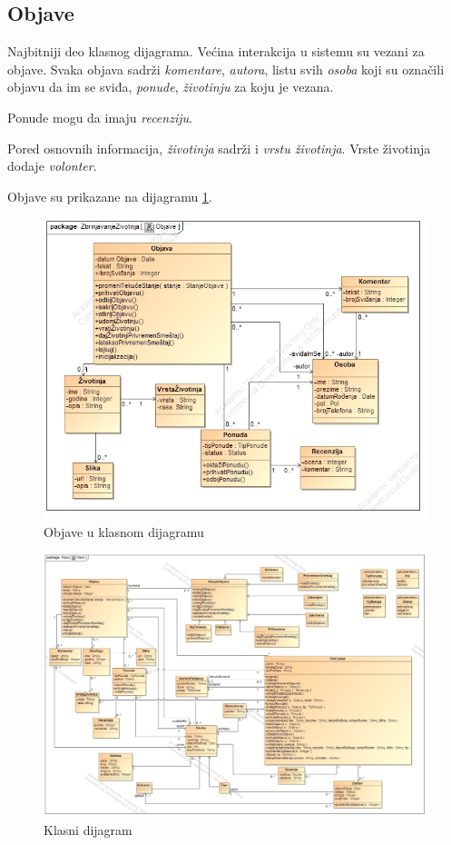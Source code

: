 \subsection{Objave}
\par Najbitniji deo klasnog dijagrama. Većina interakcija u sistemu su vezani za objave. Svaka objava sadrži \textit{komentare}, \textit{autora},
listu svih \textit{osoba} koji su označili objavu da im se sviđa, \textit{ponude}, \textit{životinju} za koju je vezana.
\par Ponude mogu da imaju \textit{recenziju}. 
\par Pored osnovnih informacija, \textit{životinja} sadrži i \textit{vrstu životinja}. Vrste životinja dodaje \textit{volonter}.
\par Objave su prikazane na dijagramu \ref{fig:posts}.
\begin{figure}[h]
    \centering
    \includegraphics[width=\textwidth, height=0.55\textwidth]{img/posts.jpg}
    \caption{Objave u klasnom dijagramu}
    \label{fig:posts}
\end{figure}
\begin{figure}
    \centering
    \includegraphics[width=\textwidth]{img/class.jpg}
    \caption{Klasni dijagram}
    \label{fig:class}
\end{figure}